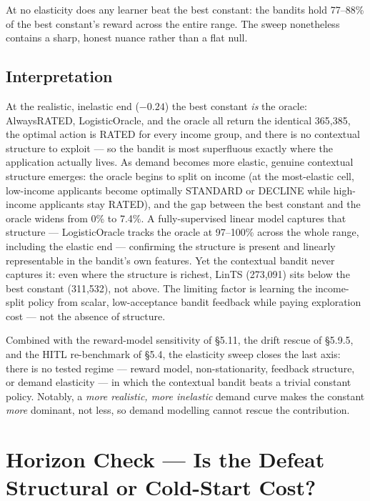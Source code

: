 At no elasticity does any learner beat the best constant: the bandits hold 77--88\% of the best constant's reward across the entire range. The sweep nonetheless contains a sharp, honest nuance rather than a flat null.

\subsection{Interpretation}\label{elasticity-interpretation}

At the realistic, inelastic end (\(-0.24\)) the best constant \emph{is} the oracle: AlwaysRATED, LogisticOracle, and the oracle all return the identical 365,385, the optimal action is RATED for every income group, and there is no contextual structure to exploit --- so the bandit is most superfluous exactly where the application actually lives. As demand becomes more elastic, genuine contextual structure emerges: the oracle begins to split on income (at the most-elastic cell, low-income applicants become optimally STANDARD or DECLINE while high-income applicants stay RATED), and the gap between the best constant and the oracle widens from 0\% to 7.4\%. A fully-supervised linear model captures that structure --- LogisticOracle tracks the oracle at 97--100\% across the whole range, including the elastic end --- confirming the structure is present and linearly representable in the bandit's own features. Yet the contextual bandit never captures it: even where the structure is richest, LinTS (273,091) sits below the best constant (311,532), not above. The limiting factor is learning the income-split policy from scalar, low-acceptance bandit feedback while paying exploration cost --- not the absence of structure.

Combined with the reward-model sensitivity of §5.11, the drift rescue of §5.9.5, and the HITL re-benchmark of §5.4, the elasticity sweep closes the last axis: there is no tested regime --- reward model, non-stationarity, feedback structure, or demand elasticity --- in which the contextual bandit beats a trivial constant policy. Notably, a \emph{more realistic, more inelastic} demand curve makes the constant \emph{more} dominant, not less, so demand modelling cannot rescue the contribution.

\section{Horizon Check --- Is the Defeat Structural or Cold-Start Cost?}\label{horizon-check}

